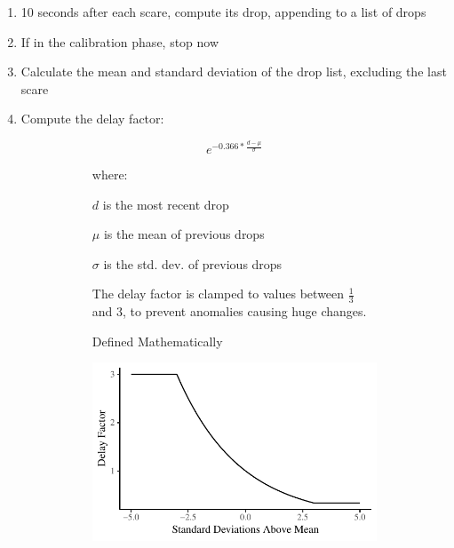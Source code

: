 \documentclass[12pt,a4paper]{article}\usepackage[]{graphicx}\usepackage[]{color}
\makeatletter
\def\maxwidth{ %
  \ifdim\Gin@nat@width>\linewidth
    \linewidth
  \else
    \Gin@nat@width
  \fi
}
\makeatother
\begin{document}
\begin{minipage}{\textwidth}
\begin{tcolorbox}[colback=black!10, title=Procedure, sharp corners]
	
	\begin{enumerate}
		\item 10 seconds after each scare, compute its drop, appending to a list of drops
		\item If in the calibration phase, stop now
		\item Calculate the mean and standard deviation of the drop list, excluding the last scare
		\item Compute the delay factor:
		
		\begin{figure}[H]
			\centering
			\begin{subfigure}[t]{.45\textwidth}
				\begin{minipage}{\linewidth}
					\begin{equation}
					e^{-0.366 * \frac{d - \mu}{\sigma}}
					\end{equation}
					
					where:
					
					$d$ is the most recent drop
					
					$\mu$ is the mean of previous drops
					
					$\sigma$ is the std. dev. of previous drops
					
					The delay factor is clamped to values between $\frac{1}{3}$ and $3$, to prevent anomalies causing huge changes.
				\end{minipage}
				\caption{Defined Mathematically}
			\end{subfigure}
			\begin{subfigure}[t]{.45\textwidth}
				\begin{minipage}{\linewidth}


{\centering \includegraphics[width=\maxwidth]{figure/DelayFactor-1} 

}
\end{minipage}
\end{subfigure}
\end{figure}
\end{enumerate}
\end{tcolorbox}
\end{minipage}
\end{document}
